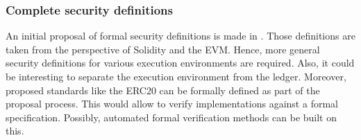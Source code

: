 \subsubsection{Complete security definitions}
An initial proposal of formal security definitions is made in \cite{Grishchenko2018}. Those definitions are taken from the perspective of Solidity and the EVM. Hence, more general security definitions for various execution environments are required. Also, it could be interesting to separate the execution environment from the ledger. Moreover, proposed standards like the ERC20 can be formally defined as part of the proposal process. This would allow to verify implementations against a formal specification. Possibly, automated formal verification methods can be built on this.




